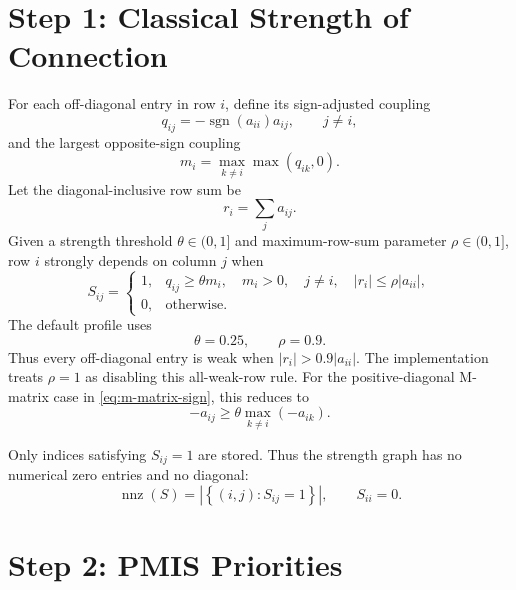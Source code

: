\documentclass[11pt]{article}
\newcommand{\abs}[1]{\left\lvert #1 \right\rvert}
\newcommand{\set}[1]{\left\{ #1 \right\}}
\DeclareMathOperator{\sgn}{sgn}
\DeclareMathOperator{\nnz}{nnz}
\begin{document}
\section{Step 1: Classical Strength of Connection}

For each off-diagonal entry in row $i$, define its sign-adjusted coupling
\begin{equation}
  q_{ij} = -\sgn(a_{ii})a_{ij},
  \qquad j\neq i,
  \label{eq:sign-adjusted-coupling}
\end{equation}
and the largest opposite-sign coupling
\begin{equation}
  m_i = \max_{k\neq i}\max(q_{ik},0).
  \label{eq:row-strength-scale}
\end{equation}
Let the diagonal-inclusive row sum be
\begin{equation}
  r_i=\sum_j a_{ij}.
  \label{eq:matrix-row-sum}
\end{equation}
Given a strength threshold $\theta\in(0,1]$ and maximum-row-sum parameter
$\rho\in(0,1]$, row $i$ strongly depends on column $j$ when
\begin{equation}
  S_{ij} =
  \begin{cases}
    1, & q_{ij}\geq\theta m_i,\quad m_i>0,\quad j\neq i,
         \quad \abs{r_i}\leq\rho\abs{a_{ii}},\\
    0, & \text{otherwise}.
  \end{cases}
  \label{eq:strength-definition}
\end{equation}
The default profile uses
\begin{equation}
  \theta=0.25,
  \qquad
  \rho=0.9.
  \label{eq:strength-threshold}
\end{equation}
Thus every off-diagonal entry is weak when
$\abs{r_i}>0.9\abs{a_{ii}}$.  The implementation treats $\rho=1$ as disabling
this all-weak-row rule.
For the positive-diagonal M-matrix case in
\eqref{eq:m-matrix-sign}, this reduces to
\begin{equation}
  -a_{ij}
  \geq
  \theta\max_{k\neq i}(-a_{ik}).
  \label{eq:m-matrix-strength}
\end{equation}

Only indices satisfying $S_{ij}=1$ are stored.  Thus the strength graph has no
numerical zero entries and no diagonal:
\begin{equation}
  \nnz(S)
  =
  \abs{\set{(i,j):S_{ij}=1}},
  \qquad
  S_{ii}=0.
  \label{eq:compact-strength}
\end{equation}

\section{Step 2: PMIS Priorities}
\end{document}
